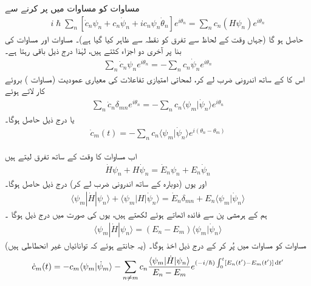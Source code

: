  مساوات    کو مساوات    میں پر کرنے سے
\begin{align}
i \hslash \sum_n [\dot{c}_n \psi_n + c_n \dot{\psi}_n + i c_n \psi_n \dot{\theta}_n] e^{i \theta_n} = \sum_n c_n (H \psi_n) e^{i \theta_n} 
\end{align}
حاصل ہو گا  (جہاں وقت کے لحاظ سے تفرق کو نقطہ  سے ظاہر کیا گیا ہے)۔  مساوات    اور  مساوات   کی بنا پر آخری دو اجزاء کٹتے ہیں،  لہٰذا درج ذیل باقی رہتا ہے۔ 
\begin{align}
\sum_n \dot{c}_n \psi_n e^{i \theta_n} = - \sum_n c_n \dot{\psi}_n e^{i \theta_n}
\end{align}
اس کا  کے ساتھ اندرونی ضرب لے کر،  لمحاتی امتیازی تفاعلات کی معیاری  عمودیت (مساوات ) بروئے کار لاتے ہوئے 
\begin{align*}
\sum_n \dot{c}_n \delta_{mn} e^{i \theta_n} = - \sum_n c_n \langle \psi_m | \dot{\psi}_n \rangle e^{i \theta_n}
\end{align*}
یا درج ذیل  حاصل ہوگا۔ 
\begin{align}\label{مساوات_حر_تفرق_عددی_سر}
\dot{c}_m (t) = - \sum_n c_n \langle \psi_m | \dot{\psi}_n \rangle e^{i(\theta_n - \theta_m)}
\end{align}

اب مساوات   کا وقت کے ساتھ تفرق لیتے ہیں 
\begin{align*}
\dot{H} \psi_n + H \dot{\psi}_n = \dot{E}_n \psi_n + E_n \dot{\psi}_n
\end{align*}
اور  یوں (دوبارہ   کے ساتھ اندرونی ضرب لے کر)  درج ذیل حاصل  ہوگا۔ 
\begin{align}
\langle \psi_m | \dot{H} | \psi_n \rangle + \langle \psi_m | H | \dot{\psi}_n \rangle = \dot{E}_n \delta_{mn} + E_n \langle \psi_m | \dot{\psi}_n \rangle
\end{align} 
ہم  کے ہرمشی  پن  سے فائدہ اٹھاتے ہوئے  لکھتے ہیں،  یوں   کی صورت  میں درج ذیل ہوگا ۔
\begin{align}\label{مساوات_حر_نابرابر_صورت}
\langle \psi_m | \dot{H} | \psi_n \rangle = (E_n - E_m) \langle \psi_m | \dot{\psi}_n \rangle
\end{align}
(یہ جانتے ہوئے کہ  توانائیاں غیر انحطاطی ہیں)  مساوات      کو مساوات    میں پُر کر کے درج ذیل اخذ ہوگا۔
\begin{align}
\dot{c}_m (t) = - c_m \langle \psi_m | \dot{\psi}_m \rangle - \sum_{n \ne m} c_n \frac{\langle \psi_m | \dot{H} | \psi_n \rangle}{E_n - E_m} e ^{(- i / \hslash) \int_0^t [E_n(t') - E_m(t')] \dif t' }
\end{align}

